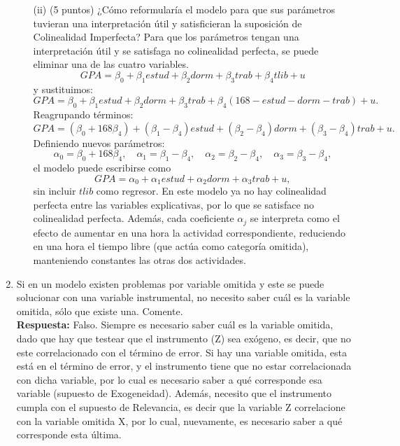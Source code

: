 \documentclass[10pt,a4paper]{article}
\begin{document}
\begin{enumerate}
\begin{enumerate}
    \item[(ii)] (5 puntos) ¿Cómo reformularía el modelo para que sus parámetros tuvieran una interpretación  útil y satisficieran la suposición de Colinealidad Imperfecta?
\color{blue}
Para que los parámetros tengan una interpretación útil y se satisfaga no colinealidad perfecta, se puede eliminar una de las cuatro variables. 
    \[
        GPA = \beta_0 + \beta_1 estud + \beta_2 dorm + \beta_3 trab + \beta_4 tlib + u
    \]
    y sustituimos:
    \[
        GPA = \beta_0 + \beta_1 estud + \beta_2 dorm + \beta_3 trab + \beta_4 (168 - estud - dorm - trab) + u.
    \]
    Reagrupando términos:
    \[
        GPA = (\beta_0 + 168\beta_4)
        + (\beta_1 - \beta_4) estud
        + (\beta_2 - \beta_4) dorm
        + (\beta_3 - \beta_4) trab
        + u.
    \]
    Definiendo nuevos parámetros:
    \[
        \alpha_0 = \beta_0 + 168\beta_4,\quad
        \alpha_1 = \beta_1 - \beta_4,\quad
        \alpha_2 = \beta_2 - \beta_4,\quad
        \alpha_3 = \beta_3 - \beta_4,
    \]
    el modelo puede escribirse como
    \[
        GPA = \alpha_0 + \alpha_1 estud + \alpha_2 dorm + \alpha_3 trab + u,
    \]
    sin incluir $tlib$ como regresor. En este modelo ya no hay colinealidad perfecta entre las variables explicativas, por lo que se satisface no colinealidad perfecta. Además, cada coeficiente $\alpha_j$ se interpreta como el efecto de aumentar en una hora la actividad correspondiente, reduciendo en una hora el tiempo libre (que actúa como categoría omitida), manteniendo constantes las otras dos actividades.
\color{black}
\end{enumerate}

    
    \item Si en un modelo existen problemas por variable omitida y este se puede solucionar con una variable instrumental, no necesito saber cuál es la variable omitida, sólo que existe una. Comente.\\
    {\color{blue}
    \textbf{Respuesta:} Falso. Siempre es necesario saber cuál es la variable omitida, dado que hay que testear que el instrumento (Z) sea exógeno, es decir, que no este correlacionado con el término de error. Si hay una variable omitida, esta está en el término de error, y el instrumento tiene que no estar correlacionada con dicha variable, por lo cual es necesario saber a qué corresponde esa variable (supuesto de Exogeneidad). Además, necesito que el instrumento cumpla con el supuesto de Relevancia, es decir que la variable Z correlacione con la variable omitida X, por lo cual, nuevamente, es necesario saber a qué corresponde esta última.}
    

\end{enumerate}
\end{document}
